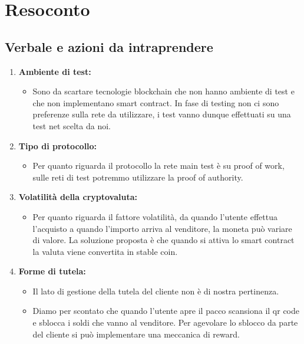 \section{Resoconto}
\subsection{Verbale e azioni da intraprendere}

\begin{enumerate}
	\item \textbf{Ambiente di test:}
	\begin{itemize}
		\item Sono da scartare tecnologie blockchain\glo{} che non hanno ambiente di test e che non implementano smart contract\glo{}.
		In fase di testing non ci sono preferenze sulla rete da utilizzare, i test vanno dunque effettuati su una test net scelta da noi.
	\end{itemize}

	\item \textbf{Tipo di protocollo:}
	\begin{itemize}
		\item Per quanto riguarda il protocollo la rete main test è su proof of work\glo, sulle reti di test potremmo utilizzare la proof of authority\glo.
	\end{itemize}

	\item \textbf{Volatilità della cryptovaluta\glo:}
	\begin{itemize}
		\item Per quanto riguarda il fattore volatilità, da quando l'utente effettua l'acquisto a quando l'importo arriva al venditore, la moneta può variare di valore.
		 La soluzione proposta è che quando si attiva lo smart contract\glo{} la valuta viene convertita in stable coin\glo.
	\end{itemize}

	\item \textbf{Forme di tutela:}
	\begin{itemize}
		\item Il lato di gestione della tutela del cliente non è di nostra pertinenza.
		\item Diamo per scontato che quando l'utente apre il pacco scansiona il qr code\glo{} e sblocca i soldi che vanno al venditore.
		 Per agevolare lo sblocco da parte del cliente si può implementare una meccanica di reward.
	\end{itemize}


\end{enumerate}
